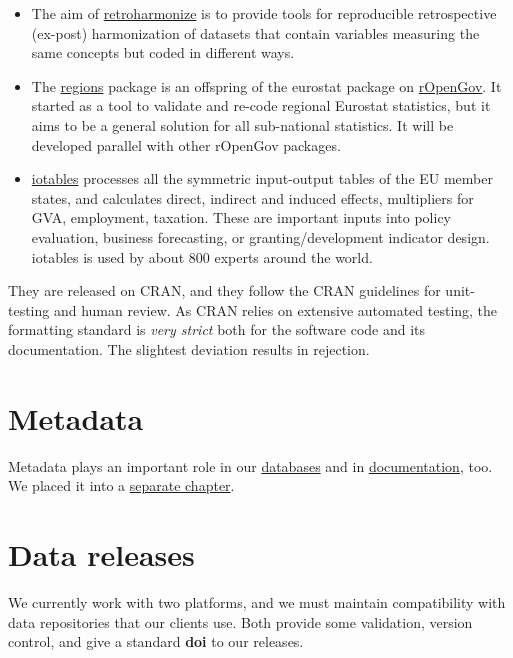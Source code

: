 \documentclass[
  fontsize=13pt,
  english,
  a4paper,
  openany, a4paper, oneside]{book}
\providecommand{\tightlist}{%
  \setlength{\itemsep}{0pt}\setlength{\parskip}{0pt}}
\begin{document}
\begin{itemize}
\tightlist
\item
  The aim of \href{https://reprex.nl/software/retroharmonize/}{retroharmonize} is to provide tools for reproducible retrospective (ex-post) harmonization of datasets that contain variables measuring the same concepts but coded in different ways.
\item
  The \href{https://reprex.nl/software/regions/}{regions} package is an offspring of the eurostat package on \href{https://github.com/rOpenGov}{rOpenGov}. It started as a tool to validate and re-code regional Eurostat statistics, but it aims to be a general solution for all sub-national statistics. It will be developed parallel with other rOpenGov packages.
\item
  \href{https://reprex.nl/software/iotables/}{iotables} processes all the symmetric input-output tables of the EU member states, and calculates direct, indirect and induced effects, multipliers for GVA, employment, taxation. These are important inputs into policy evaluation, business forecasting, or granting/development indicator design. iotables is used by about 800 experts around the world.
\end{itemize}

They are released on CRAN, and they follow the CRAN guidelines for unit-testing and human review. As CRAN relies on extensive automated testing, the formatting standard is \emph{very strict} both for the software code and its documentation. The slightest deviation results in rejection.

\hypertarget{documentation-metadata}{%
\section{Metadata}\label{documentation-metadata}}

Metadata plays an important role in our \protect\hyperlink{data-storage}{databases} and in \protect\hyperlink{documentation}{documentation}, too. We placed it into a \protect\hyperlink{metadata}{separate chapter}.

\hypertarget{data-release}{%
\section{Data releases}\label{data-release}}

We currently work with two platforms, and we must maintain compatibility with data repositories that our clients use. Both provide some validation, version control, and give a standard \textbf{doi} to our releases.
\end{document}

